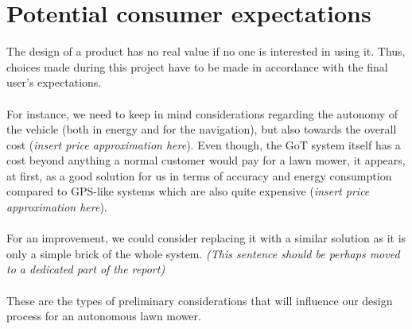 \section{Potential consumer expectations}
The design of a product has no real value if no one is interested in using it. Thus, choices made during this project have to be made in accordance with the final user's expectations.\\\\
For instance, we need to keep in mind considerations regarding the autonomy of the vehicle (both in energy and for the navigation), but also towards the overall cost (\emph{insert price approximation here}). Even though, the GoT system itself has a cost beyond anything a normal customer would pay for a lawn mower, it appears, at first, as a good solution for us in terms of accuracy and energy consumption compared to GPS-like systems which are also quite expensive (\emph{insert price approximation here}). \\\\
For an improvement, we could consider replacing it with a similar solution as it is only a simple brick of the whole system. \emph{(This sentence should be perhaps moved to a dedicated part of the report)}\\\\
These are the types of preliminary considerations that will influence our design process for an autonomous lawn mower.